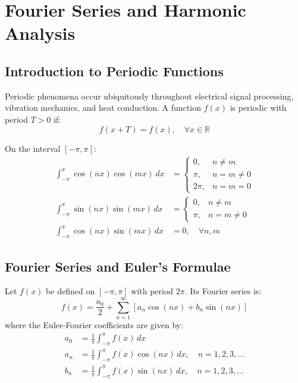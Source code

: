 \chapter{Fourier Series and Harmonic Analysis}
\label{chap:fourier-series}

\section{Introduction to Periodic Functions}
Periodic phenomena occur ubiquitously throughout electrical signal processing, vibration mechanics, and heat conduction. A function $f(x)$ is periodic with period $T > 0$ if:
\begin{equation}
f(x + T) = f(x), \quad \forall x \in \mathbb{R}
\end{equation}

\begin{theorem}
On the interval $[-\pi, \pi]$:
\begin{align}
\int_{-\pi}^{\pi} \cos(nx) \cos(mx) \, dx &= \begin{cases} 0, & n \neq m \\ \pi, & n = m \neq 0 \\ 2\pi, & n = m = 0 \end{cases} \\
\int_{-\pi}^{\pi} \sin(nx) \sin(mx) \, dx &= \begin{cases} 0, & n \neq m \\ \pi, & n = m \neq 0 \end{cases} \\
\int_{-\pi}^{\pi} \cos(nx) \sin(mx) \, dx &= 0, \quad \forall n, m
\end{align}
\end{theorem}

\section{Fourier Series and Euler's Formulae}
\begin{definition}
Let $f(x)$ be defined on $[-\pi, \pi]$ with period $2\pi$. Its Fourier series is:
\begin{equation}
f(x) = \frac{a_0}{2} + \sum_{n=1}^{\infty} \left[ a_n \cos(nx) + b_n \sin(nx) \right]
\end{equation}
where the Euler-Fourier coefficients are given by:
\begin{align}
a_0 &= \frac{1}{\pi} \int_{-\pi}^{\pi} f(x) \, dx \\
a_n &= \frac{1}{\pi} \int_{-\pi}^{\pi} f(x) \cos(nx) \, dx, \quad n = 1, 2, 3, \dots \\
b_n &= \frac{1}{\pi} \int_{-\pi}^{\pi} f(x) \sin(nx) \, dx, \quad n = 1, 2, 3, \dots
\end{align}
\end{definition}

